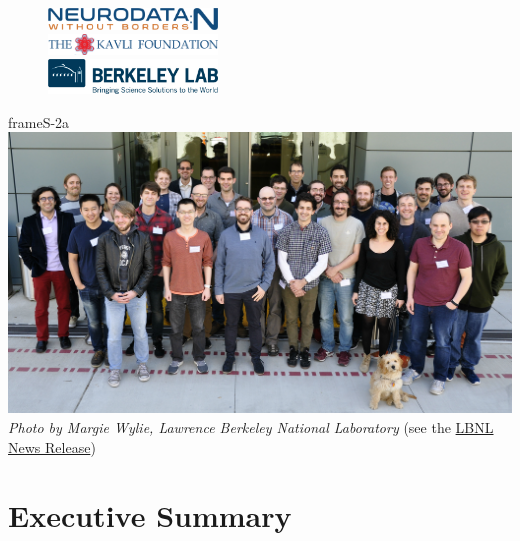 \documentclass{article}
\begin{document}
\begin{figure}[b!]
\vspace{-0.5cm}
\centering
\includegraphics[width=0.4\textwidth]{nwb_n_logo.png} \\
\vspace{0.3cm}
\includegraphics[width=0.4\textwidth]{kavli_logo.png} \\
\vspace{0.3cm}
\includegraphics[width=0.4\textwidth]{lbnl_logo.jpg}
\end{figure}


\clearpage

\begin{staticcontents*}{frameS-2a}
\includegraphics[width=\textwidth]{20180426-NWBN-Hackathon-Group-3.jpg}
\small \textit{Photo by Margie Wylie, Lawrence Berkeley National Laboratory} (see the \href{http://today.lbl.gov/2018/04/30/berkeley-lab-hosts-neurodata-without-borders-hackathon/}{LBNL News Release})
\end{staticcontents*}




\tableofcontents
\clearpage

\section{Executive Summary}
\label{sec:es}
\end{document}
